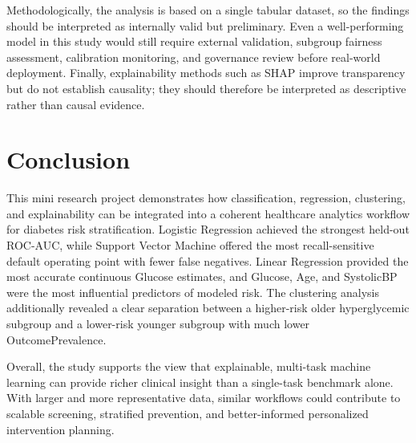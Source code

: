 \documentclass[conference]{IEEEtran}
\begin{document}
Methodologically, the analysis is based on a single tabular dataset, so the findings should be interpreted as internally valid but preliminary. Even a well-performing model in this study would still require external validation, subgroup fairness assessment, calibration monitoring, and governance review before real-world deployment. Finally, explainability methods such as SHAP improve transparency but do not establish causality; they should therefore be interpreted as descriptive rather than causal evidence.

\section{Conclusion}
This mini research project demonstrates how classification, regression, clustering, and explainability can be integrated into a coherent healthcare analytics workflow for diabetes risk stratification. Logistic Regression achieved the strongest held-out ROC-AUC, while Support Vector Machine offered the most recall-sensitive default operating point with fewer false negatives. Linear Regression provided the most accurate continuous Glucose estimates, and Glucose, Age, and SystolicBP were the most influential predictors of modeled risk. The clustering analysis additionally revealed a clear separation between a higher-risk older hyperglycemic subgroup and a lower-risk younger subgroup with much lower OutcomePrevalence.

Overall, the study supports the view that explainable, multi-task machine learning can provide richer clinical insight than a single-task benchmark alone. With larger and more representative data, similar workflows could contribute to scalable screening, stratified prevention, and better-informed personalized intervention planning.
\end{document}
